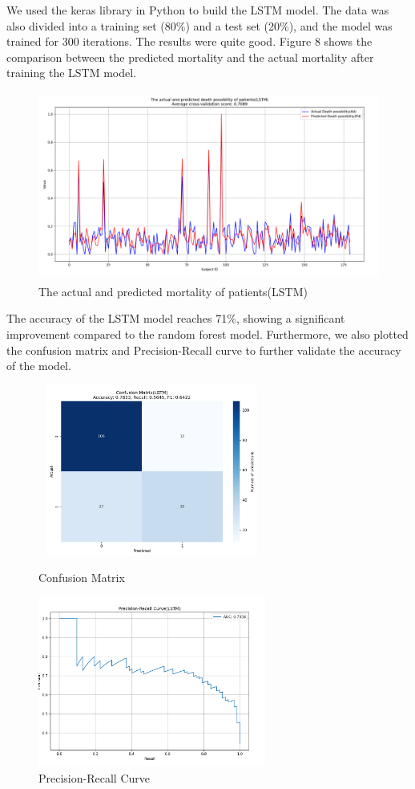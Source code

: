 \documentclass[13pt]{ctexart}
\begin{document}
We used the keras library in Python to build the LSTM model. The data was also divided into a training set (80\%) and a test set (20\%), and the model was trained for 300 iterations. The results were quite good. Figure 8 shows the comparison between the predicted mortality and the actual mortality after training the LSTM model.

\begin{figure}[h]
    \centering
        \includegraphics[width=12cm,height=6.2cm]{pics/8.png}
        \caption{The actual and predicted mortality of patients(LSTM)}
\end{figure}

The accuracy of the LSTM model reaches 71\%, showing a significant improvement compared to the random forest model. Furthermore, we also plotted the confusion matrix and Precision-Recall curve to further validate the accuracy of the model.

\begin{figure}[H]
    \begin{minipage}{0.5\textwidth}
        \centering
        \includegraphics[width=7.5cm,height=5.6cm]{pics/9.png}
        \caption{Confusion Matrix}
    \end{minipage}
    \begin{minipage}{0.5\textwidth}
        \centering
        \includegraphics[width=7.5cm,height=5.6cm]{pics/10.png}
        \caption{Precision-Recall Curve}
    \end{minipage}
\end{figure}
\end{document}
